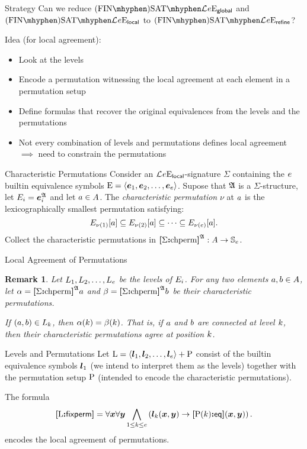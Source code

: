 \documentclass{beamer}
\newtheorem{remark}{Remark}
\begin{document}
\begin{frame}{Strategy}
Can we reduce $\FinASat{\Lvp\LL\nonv\nopow\Eea\sze\agglobal}$ and
$\FinASat{\Lvp\LL\nonv\nopow\Eea\sze\aglocal}$ to
$\FinASat{\Lvp\LL\nonv\nopow\Eea\sze\agrefine}$?
\pause

Idea (for local agreement):
\begin{itemize}
  \item Look at the levels
  \pause
  \item Encode a permutation witnessing the local agreement at each element in a
  permutation setup
  \pause
  \item Define formulas that recover the original equivalences from the
  levels and the permutations
  \pause
  \item Not every combination of levels and permutations defines
  local agreement $\implies$ need to constrain the permutations
\end{itemize}
\end{frame}

\begin{frame}{Characteristic Permutations}
Consider an $\mathcal{L}^{{}}_{{}}{e}\mathrm{E}_{\mathsf{local}}$-signature $\Sigma$ containing
the $e$ builtin equivalence symbols ${\mathrm{E}} = \left\langle \bm{e}_{1},\bm{e}_{2},\dots,\bm{e}_{e} \right\rangle$.
Supose that $\mathfrak{A}$ is a $\Sigma$-structure, let $E_{i} =
\bm{e}_{i}^{\mathfrak{A}}$ and let $a\in A$.
The \emph{characteristic permutation} $\nu$ at $a$ is the lexicographically
smallest permutation satisfying:
\[
E_{\nu(1)}[a] \subseteq E_{\nu(2)}[a] \subseteq \dots
\subseteq E_{\nu(e)}[a].
\]
Collect the characteristic permutations in ${\bm{[}\Sigma\mathord{\bm{:}}\mathrm{chperm}\bm{]}}^{\mathfrak{A}} : A \to
\mathbb{S}_{e}$.
\end{frame}

\begin{frame}{Local Agreement of Permutations}
\begin{remark}
Let $L_{1},L_{2},\dots,L_{e}$ be the levels of $E_{i}$.
For any two elements $a,b\in A$, let $\alpha = {\bm{[}\Sigma\mathord{\bm{:}}\mathrm{chperm}\bm{]}}^{\mathfrak{A}}a$
and $\beta = {\bm{[}\Sigma\mathord{\bm{:}}\mathrm{chperm}\bm{]}}^{\mathfrak{A}}b$ be their characteristic permutations.

If $(a,b)\in L_{k}$, then $\alpha(k) = \beta(k)$.
That is, if $a$ and $b$ are connected at level $k$, then their
characteristic permutations agree at position $k$.
\end{remark}
\end{frame}

\begin{frame}{Levels and Permutations}
Let ${\mathrm{L}} = \left\langle \bm{l}_{1},\bm{l}_{2},\dots,\bm{l}_{e} \right\rangle + {\mathrm{P}}$ consist of the builtin
equivalence symbols $\bm{l}_{1}$ (we intend to interpret them as the levels)
together with the permutation setup ${\mathrm{P}}$ (intended to encode the
characteristic permutations).

The formula
\[
  {\bm{[}{\mathrm{L}}\mathord{\bm{:}}\mathsf{fixperm}\bm{]}} = \forall\bm{x} \forall\bm{y} \bigwedge_{1 \leq k \leq e}
  \left(\bm{l}_{k}(\bm{x},\bm{y}) \rightarrow {\bm{[}{\mathrm{P}}(k)\mathord{\bm{:}}\mathsf{eq}\bm{]}}(\bm{x},\bm{y})\right).
\]
encodes the local agreement of permutations.
\end{frame}
\end{document}
